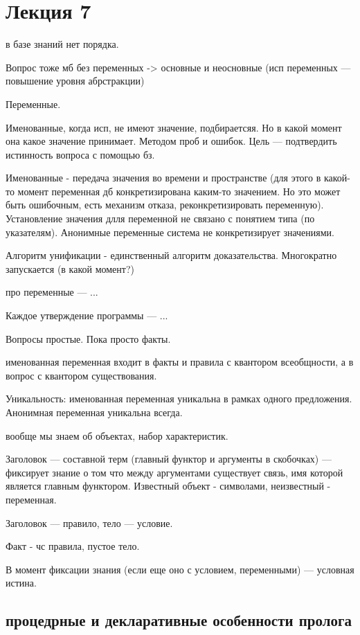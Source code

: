 \chapter{Лекция 7}

в базе знаний нет порядка.

Вопрос тоже мб без переменных -> основные и неосновные (исп переменных — повышение уровня абрстракции)

Переменные.

Именованные, когда исп, не имеют значение, подбираетсяя. Но в какой момент она какое значение принимает. Методом проб и ошибок. Цель — подтвердить истинность вопроса с помощью бз.

Именованные - передача значения во времени и пространстве (для этого в какой-то момент переменная дб конкретизирована каким-то значением. Но это может быть ошибочным, есть механизм отказа, реконкретизировать переменную). Установление значения длля переменной не связано с понятием типа (по указателям). Анонимные переменные система не конкретизирует значениями.

Алгоритм унификации - единственный алгоритм доказательства. Многократно запускается (в какой момент?)

про переменные — ...

Каждое утверждение программы — ...



Вопросы простые. Пока просто факты.

именованная переменная входит в факты и правила с квантором всеобщности, а в вопрос с квантором существования.

Уникальность: именованная переменная уникальна в рамках одного предложения. Анонимная переменная уникальна всегда.

вообще мы знаем об объектах, набор характеристик.

Заголовок — составной терм (главный функтор и аргументы в скобочках) — фиксирует знание о том что между аргументами существует связь, имя которой является главным функтором. Известный объект - символами, неизвестный - переменная.

Заголовок — правило, тело — условие.

Факт - чс правила, пустое тело.

В момент фиксации знания (если еще оно с условием, переменными) — условная истина.

\section*{процедрные и декларативные особенности пролога}

